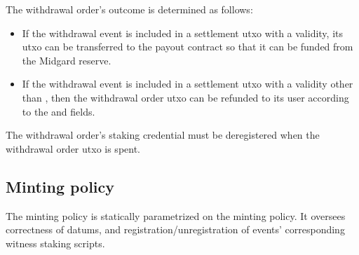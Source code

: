 \documentclass[../midgard.tex]{subfiles}
\begin{document}
The withdrawal order's outcome is determined as follows:
\begin{itemize}
  \item If the withdrawal event is included in a settlement utxo with a  validity, its utxo can be transferred to the payout contract so that it can be funded from the Midgard reserve.
  \item If the withdrawal event is included in a settlement utxo with a validity other than , then the withdrawal order utxo can be refunded to its user according to the  and  fields.
\end{itemize}

The withdrawal order's  staking credential must be deregistered when the withdrawal order utxo is spent.

\subsection{Minting policy}
\label{h:withdrawal-order-minting-policy}

The  minting policy is statically parametrized on the  minting policy.
It oversees correctness of datums, and registration/unregistration of events' corresponding witness staking scripts.
\end{document}
